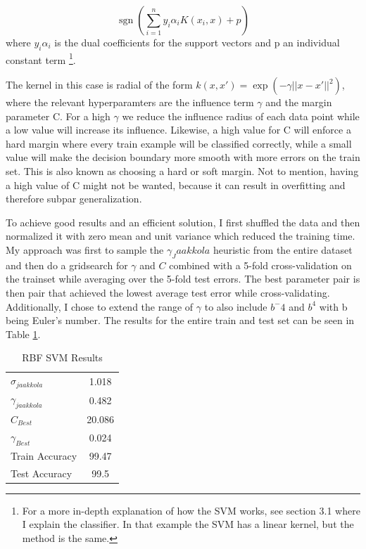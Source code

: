 \documentclass{article}
\DeclareMathOperator{\sgn}{sgn}
\theoremstyle{plain}
\theoremstyle{nonumberplain}
\begin{document}
\begin{equation} \label{svm}
\sgn{(\sum_{i=1}^n y_i \alpha_i K(x_i,x) + p)}
\end{equation}
where $y_i\alpha_i$ is the dual coefficients for the support vectors and p an individual constant term \footnote{For a more in-depth explanation of how the SVM works, see section 3.1 where I explain the classifier. In that example the SVM has a linear kernel, but the method is the same.}.

The kernel in this case is radial of the form $k(x,x') = \exp{ (-\gamma || x - x' ||^2) }$, where the relevant hyperparamters are the influence term $\gamma$ and the margin parameter C. For a high $\gamma$ we reduce the influence radius of each data point while a low value will increase its influence.
Likewise, a high value for C will enforce a hard margin where every train example will be classified correctly, while a small value will make the decision boundary more smooth with more errors on the train set. This is also known as choosing a hard or soft margin. 
Not to mention, having a high value of C might not be wanted, because it can result in overfitting and therefore subpar generalization. 

To achieve good results and an efficient solution, I first shuffled the data and then normalized it with zero mean and unit variance which reduced the training time. 
My approach was first to sample the $\gamma_Jaakkola$ heuristic from the entire dataset and then do a gridsearch for $\gamma$ and $C$ combined with a 5-fold cross-validation on the trainset while averaging over the 5-fold test errors.
The best parameter pair is then pair that achieved the lowest average test error while cross-validating.  
Additionally, I chose to extend the range of $\gamma$ to also include $b^-4$ and $b^4$ with b being Euler's number. 
The results for the entire train and test set can be seen in Table \ref{table:rbfsvm}. 


\begin{table}[htb]
\centering
\caption{RBF SVM Results}
\label{table:rbfsvm}
\begin{tabular}{l|c}
	\hline \hline
	$\sigma_{jaakkola}$ & 1.018 \\
	$\gamma_{jaakkola}$  & 0.482 \\
	$C_{Best}$ & 20.086 \\
	$\gamma_{Best}$ & 0.024 \\
	Train Accuracy & 99.47 \\
	Test Accuracy & 99.5 \\
\end{tabular}
\end{table}
\end{document}
